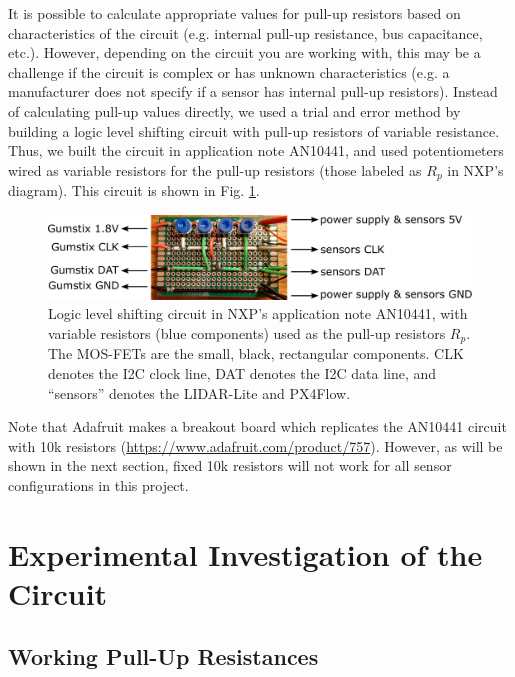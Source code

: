 \documentclass[10pt]{article}
\begin{document}
It is possible to calculate appropriate values for pull-up resistors based on characteristics of the circuit (e.g. internal pull-up resistance, bus capacitance, etc.). However, depending on the circuit you are working with, this may be a challenge if the circuit is complex or has unknown characteristics (e.g. a manufacturer does not specify if a sensor has internal pull-up resistors). Instead of calculating pull-up values directly, we used a trial and error method by building a logic level shifting circuit with pull-up resistors of variable resistance. Thus, we built the circuit in application note AN10441, and used potentiometers wired as variable resistors for the pull-up resistors (those labeled as $R_p$ in NXP's diagram). This circuit is shown in Fig. \ref{fig:logic_level_shifing_circuit}.
\begin{figure}[ht]
\centering
\includegraphics[width=1.0\textwidth]{../photos/board.pdf}
\caption{Logic level shifting circuit in NXP's application note AN10441, with variable resistors (blue components) used as the pull-up resistors $R_p$. The MOS-FETs are the small, black, rectangular components. CLK denotes the I2C clock line, DAT denotes the I2C data line, and ``sensors'' denotes the LIDAR-Lite and PX4Flow.}
\label{fig:logic_level_shifing_circuit}
\end{figure}
Note that Adafruit makes a breakout board which replicates the AN10441 circuit with 10k resistors (\url{https://www.adafruit.com/product/757}). However, as will be shown in the next section, fixed 10k resistors will not work for all sensor configurations in this project.


\section*{Experimental Investigation of the Circuit}

\subsection*{Working Pull-Up Resistances}
\end{document}
